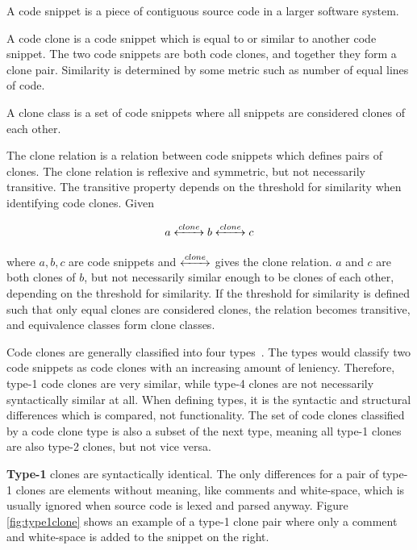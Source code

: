 \begin{definition}
	A code snippet is a piece of contiguous source code in a larger software system.
\end{definition}

\begin{definition}
	A code clone is a code snippet which is equal to or similar to another code snippet. The two
	code snippets are both code clones, and together they form a clone pair.
	Similarity is determined by some metric such as number of equal lines of code.
\end{definition}

\begin{definition}
	A clone class is a set of code snippets where all snippets are considered clones of each
	other.
\end{definition}


The clone relation is a relation between code snippets which defines pairs of clones.
The clone relation is reflexive and symmetric, but not necessarily transitive. The transitive
property depends on the threshold for similarity when identifying code clones. Given

$$a \xleftrightarrow{clone} b \xleftrightarrow{clone} c$$


where $a,b,c$ are code snippets and $\xleftrightarrow{clone}$ gives the clone relation.
$a$ and $c$ are both clones of $b$, but not necessarily similar enough to be clones of
each other, depending on the threshold for similarity. If the threshold for similarity is
defined such that only equal clones are considered clones, the relation becomes
transitive, and equivalence classes form clone classes.

Code clones are generally classified into four types~\cite{Inoue_introduction_to_cc}. The
types would classify two code snippets as code clones with an increasing amount of
leniency. Therefore, type-1 code clones are very similar, while type-4 clones are not
necessarily syntactically similar at all. When defining types, it is the syntactic and
structural differences which is compared, not functionality. The set of code clones
classified by a code clone type is also a subset of the next type, meaning all type-1
clones are also type-2 clones, but not vice versa.

\textbf{Type-1} clones are syntactically identical. The only differences for a pair of
type-1 clones are elements without meaning, like comments and white-space, which is
usually ignored when source code is lexed and parsed anyway. Figure \ref{fig:type1clone}
shows an example of a type-1 clone pair where only a comment and white-space is added to
the snippet on the right.

